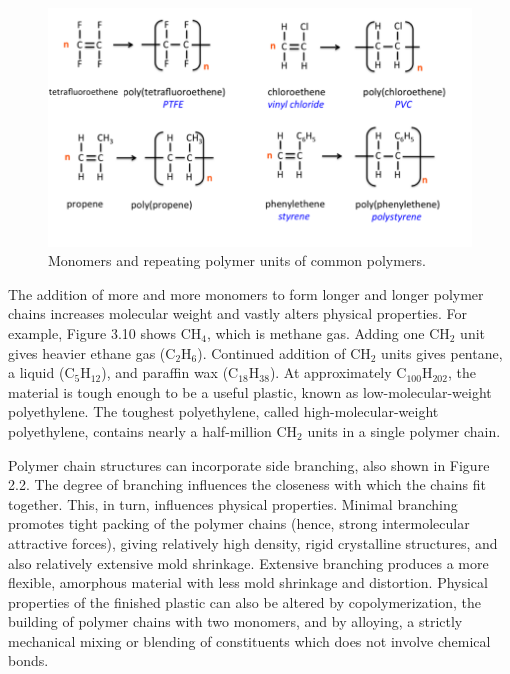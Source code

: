 \documentclass[
10pt,
a4paper,
openany,
svgnames,
]{book}
\begin{document}
\begin{figure}[h]
  \centering
  \includegraphics[scale=0.5]{pictures/Material-selection/polymer}
  \caption{Monomers and repeating polymer units of common polymers. \cite{secondaryscience4all}}
  \label{fig: polymers and repeating units}
\end{figure}
 
The addition of more and more monomers to form longer and longer polymer chains increases molecular weight and vastly alters physical properties. For example, Figure 3.10 shows $\text{CH}_4$, which is methane gas. Adding one $\text{CH}_2$ unit gives heavier ethane gas (C$_2$H$_6$). Continued addition of $\text{CH}_2$ units gives pentane, a liquid ($\text{C}_5\text{H}_{12}$), and paraffin wax ($\text{C}_{18}\text{H}_{38}$). At approximately $\text{C}_{100}\text{H}_{202}$, the material is tough enough to be a useful plastic, known as low-molecular-weight polyethylene. The toughest polyethylene, called high-molecular-weight polyethylene, contains nearly a half-million $\text{CH}_2$ units in a single polymer chain.

Polymer chain structures can incorporate side branching, also shown in Figure 2.2. The degree of branching influences the closeness with which the chains fit together. This, in turn, influences physical properties. Minimal branching promotes tight packing of the polymer chains (hence, strong intermolecular attractive forces), giving relatively high density, rigid crystalline structures, and also relatively extensive mold shrinkage. Extensive branching produces a more flexible, amorphous material with less mold shrinkage and distortion. Physical properties of the finished plastic can also be altered by copolymerization, the building of polymer chains with two monomers, and by alloying, a strictly mechanical mixing or blending of constituents which does not involve chemical bonds. 
 
\end{document}
